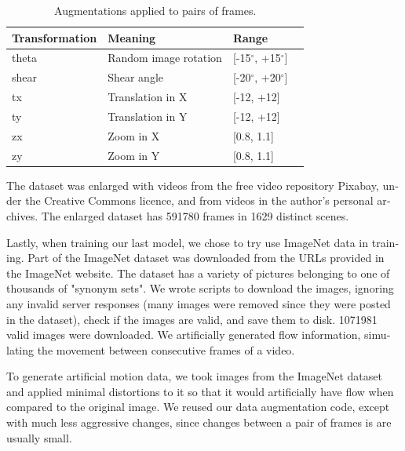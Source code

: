 \documentclass[12pt,openright,oneside,a4paper,english]{abntex2}
\begin{document}
\begin{otherlanguage}{english}
    \begin{table}[H]
        \centering
        \begin{tabular}{llll}
        Transformation & Meaning               & Range          &  \\ \hline
        theta          & Random image rotation & [-15$^{\circ}$, +15$^{\circ}$]   &  \\
        shear          & Shear angle           & [-20$^{\circ}$, +20$^{\circ}$] &  \\ \hline
        tx             & Translation in X      & [-12, +12]       &  \\
        ty             & Translation in Y      & [-12, +12]       &  \\ \hline
        zx             & Zoom in X             & [0.8, 1.1]       &  \\
        zy             & Zoom in Y             & [0.8, 1.1]       &  \\ \hline
        \end{tabular}
        \label{table:augmentations}
        \caption{Augmentations applied to pairs of frames.}
    \end{table}

    The dataset was enlarged with videos from the free video repository Pixabay, under the Creative Commons licence, and from videos in the author's personal archives. The enlarged dataset has 591780 frames in 1629 distinct scenes.

    Lastly, when training our last model, we chose to try use ImageNet \cite{imagenet_cvpr09} data in training. Part of the ImageNet dataset was downloaded from the URLs provided in the ImageNet website. The dataset has a variety of pictures belonging to one of thousands of "synonym sets". We wrote scripts to download the images, ignoring any invalid server responses (many images were removed since they were posted in the dataset), check if the images are valid, and save them to disk. 1071981 valid images were downloaded.  We artificially generated flow information, simulating the movement between consecutive frames of a video.

    \label{artificial_flow}

    To generate artificial motion data, we took images from the ImageNet dataset and applied minimal distortions to it so that it would artificially have flow when compared to the original image. We reused our data augmentation code, except with much less aggressive changes, since changes between a pair of frames is are usually small.


\end{otherlanguage}
\end{document}
